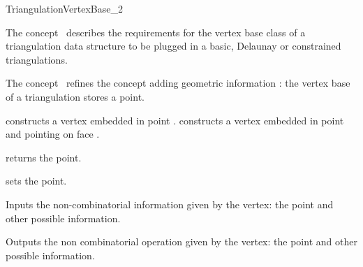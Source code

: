 

\begin{ccRefConcept}{TriangulationVertexBase_2}


\ccDefinition
  
The concept \ccRefName\ describes the requirements for the
vertex base class of a triangulation data structure
to be plugged in a basic, Delaunay or constrained
triangulations.

The concept \ccRefName\ refines the concept
adding geometric information :
the vertex base of a triangulation stores a point.


\ccCreation
{}  %


{constructs a vertex embedded in point .}
{constructs a vertex embedded in point  and pointing on face .}

\ccAccessFunctions
{}
{returns  the point.}
\ccGlue
{}

{sets the point.}


{Inputs the non-combinatorial information given by the vertex: 
the point and other possible information.}

{Outputs the non combinatorial operation given by the vertex: the
point and other possible information.}





\end{ccRefConcept}
